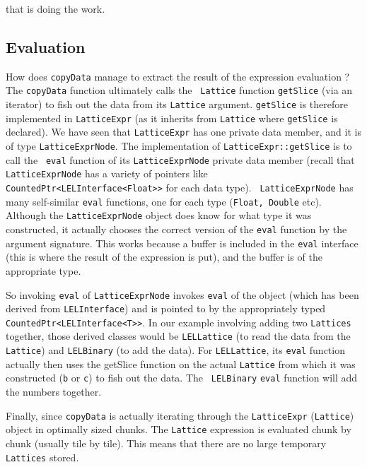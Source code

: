 that is doing the work.



\subsection {Evaluation}

How does {\tt copyData} manage to extract the result of the expression
evaluation ? The {\tt copyData} function ultimately calls the {\tt
Lattice} function {\tt getSlice} (via an iterator) to fish out the data
from its {\tt Lattice} argument.  {\tt getSlice} is therefore
implemented in {\tt LatticeExpr} (as it inherits from {\tt Lattice}
where {\tt getSlice} is declared).  We have seen that {\tt LatticeExpr}
has one private data member, and it is of type {\tt LatticeExprNode}. 
The implementation of {\tt LatticeExpr::getSlice} is to call the {\tt
eval} function of its {\tt LatticeExprNode} private data member (recall
that {\tt LatticeExprNode} has a variety of pointers like {\tt
CountedPtr<LELInterface<Float>>} for each data type).  {\tt
LatticeExprNode} has many self-similar {\tt eval} functions, one for
each type ({\tt Float, Double} etc).  Although the {\tt LatticeExprNode}
object does know for what type it was constructed, it actually chooses
the correct version of the {\tt eval} function by the argument
signature.  This works because a buffer is included in the {\tt eval}
interface (this is where the result of the expression is put), and the
buffer is of the appropriate type. 

So invoking {\tt eval} of {\tt LatticeExprNode} invokes {\tt eval} of
the object (which has been derived from {\tt LELInterface}) and is
pointed to by the appropriately typed {\tt
CountedPtr<LELInterface<T>>}.  In our example involving adding two
{\tt Lattices} together, those derived classes would be {\tt LELLattice}
(to read the data from the {\tt Lattice}) and {\tt LELBinary} (to add
the data).  For {\tt LELLattice}, its {\tt eval} function actually then
uses the getSlice function on the actual {\tt Lattice} from which it was
constructed ({\tt b} or {\tt c}) to fish out the data.  The {\tt
LELBinary} {\tt eval} function will add the numbers together. 

Finally, since {\tt copyData} is actually iterating through the {\tt LatticeExpr}
({\tt Lattice}) object in optimally sized chunks.  The {\tt Lattice} expression is
evaluated chunk by chunk (usually tile by tile).  This means that there
are no large temporary {\tt Lattices} stored. 

